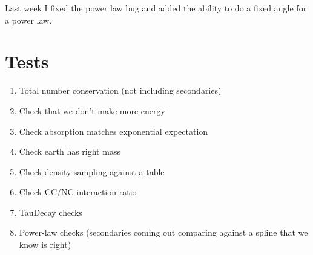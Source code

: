 Last week I fixed the power law bug and added the ability to do a fixed angle for a power law. 

\section{Tests}
\begin{enumerate}
    \item Total number conservation (not including secondaries)
    \item Check that we don't make more energy 
    \item Check absorption matches exponential expectation
    \item Check earth has right mass
    \item Check density sampling against a table
    \item Check CC/NC interaction ratio
    \item TauDecay checks
    \item Power-law checks (secondaries coming out comparing against a spline that we know is right)
\end{enumerate}